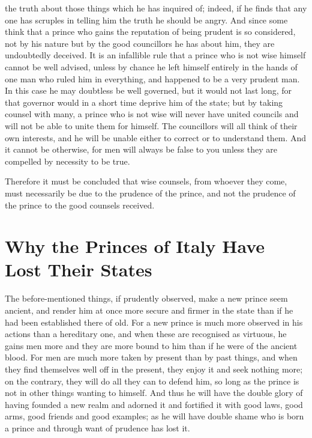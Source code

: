 \documentclass[12pt,letterpaper]{memoir}
\begin{document}
the truth about those things which he has inquired of; indeed, if he
finds that any one has scruples in telling him the truth he should be
angry. And since some think that a prince who gains the reputation
of being prudent is so considered, not by his nature but by the good
councillors he has about him, they are undoubtedly deceived. It is an
infallible rule that a prince who is not wise himself cannot be well
advised, unless by chance he left himself entirely in the hands of one
man who ruled him in everything, and happened to be a very prudent
man. In this case he may doubtless be well governed, but it would not
last long, for that governor would in a short time deprive him of the
state; but by taking counsel with many, a prince who is not wise will
never have united councils and will not be able to unite them for
himself. The councillors will all think of their own interests, and he
will be unable either to correct or to understand them. And it cannot
be otherwise, for men will always be false to you unless they are
compelled by necessity to be true.

Therefore it must be concluded that wise counsels, from whoever they
come, must necessarily be due to the prudence of the prince, and not
the prudence of the prince to the good counsels received.

\chapter{Why the Princes of Italy Have Lost Their States}

The before-mentioned things, if prudently observed, make a new prince
seem ancient, and render him at once more secure and firmer in the
state than if he had been established there of old. For a new prince is
much more observed in his actions than a hereditary one, and when these
are recognised as virtuous, he gains men more and they are more bound
to him than if he were of the ancient blood. For men are much more
taken by present than by past things, and when they find themselves
well off in the present, they enjoy it and seek nothing more; on the
contrary, they will do all they can to defend him, so long as the
prince is not in other things wanting to himself. And thus he will
have the double glory of having founded a new realm and adorned it and
fortified it with good laws, good arms, good friends and good examples;
as he will have double shame who is born a prince and through want of
prudence has lost it.
\end{document}
